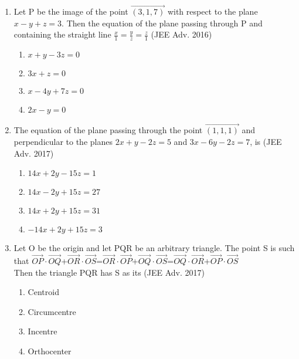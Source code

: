 \documentclass[journal,12pt,twocolumn]{IEEEtran}
\theoremstyle{remark}
\begin{document}
\begin{enumerate}
         \item %
		 Let P be the image of the point $\vec{(3,1,7)}$ with respect to the plane $x-y+z=3$. Then the equation of the plane passing through P and containing the straight line $\frac{x}{1}=\frac{y}{z}=\frac{z}{1}$ \hfill{(JEE Adv. 2016)}\\
\begin{enumerate}
        \item $x+y-3z=0$                             
        \item $3x+z=0$                           
        \item $x-4y+7z=0$            
        \item $2x-y=0$\\          
\end{enumerate}

         \item %
		 The equation of the plane passing through the point $\vec{(1,1,1)}$ and perpendicular to the planes $2x+y-2z=5$ and $3x-6y-2z=7$, is \hfill{(JEE Adv. 2017)}\\
\begin{enumerate}
        \item $14x+2y-15z=1$                             
        \item $14x-2y+15z=27$                           
        \item $14x+2y+15z=31$            
        \item $-14x+2y+15z=3$\\          
\end{enumerate}

         \item %
		 Let O be the origin and let PQR be an arbitrary triangle. The point S is such that $\vec{OP}\cdot\vec{OQ}$+$\vec{OR}\cdot\vec{OS}$=$\vec{OR}\cdot\vec{OP}$+$\vec{OQ}\cdot\vec{OS}$=$\vec{OQ}\cdot\vec{OR}$+$\vec{OP}\cdot\vec{OS}$\\
Then the triangle PQR has S as its \hfill{(JEE Adv. 2017)}\\
\begin{enumerate}
        \item Centroid                             
        \item Circumcentre                           
        \item Incentre            
        \item Orthocenter\\          
\end{enumerate}
\end{enumerate}
\end{document}
